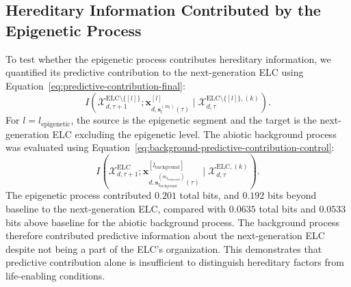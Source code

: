 \documentclass[11pt]{article}
\newcommand{\ELC}{\mathrm{ELC}}
\begin{document}
\subsection{Hereditary Information Contributed by the Epigenetic Process}
To test whether the epigenetic process contributes hereditary information, we quantified its predictive contribution to the next-generation ELC using Equation~\ref{eq:predictive-contribution-final}:
\begin{equation}
I\left(
\mathcal{X}^{\ELC\setminus\{[l]\}}_{d,\tau+1};
\mathbf{x}^{[l]}_{d,\mathbf{s}^{(m_l)}_l(\tau)}
\mid
\mathcal{X}^{\ELC\setminus\{[l]\},(k)}_{d,\tau}
\right).
\label{eq:predictive-contribution-final}
\end{equation}
For $l=l_{\mathrm{epigenetic}}$, the source is the epigenetic segment and the target is the next-generation ELC excluding the epigenetic level. The abiotic background process was evaluated using Equation~\ref{eq:background-predictive-contribution-control}:
\begin{equation}
I\left(
\mathcal{X}^{\ELC}_{d,\tau+1};
\mathbf{x}^{[l_{\mathrm{background}}]}_
{d,\mathbf{s}^{(m_{l_{\mathrm{background}}})}_{l_{\mathrm{background}}}(\tau)}
\mid
\mathcal{X}^{\ELC,(k)}_{d,\tau}
\right).
\label{eq:background-predictive-contribution-control}
\end{equation}
The epigenetic process contributed $0.201$ total bits, and $0.192$ bits beyond baseline to the next-generation ELC, compared with $0.0635$ total bits and $0.0533$ bits above baseline for the abiotic background process. The background process therefore contributed predictive information about the next-generation ELC despite not being a part of the ELC's organization. This demonstrates that predictive contribution alone is insufficient to distinguish hereditary factors from life-enabling conditions.
\end{document}
